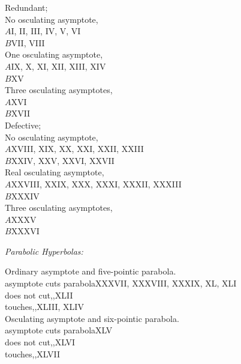 \documentclass[11pt,a4paper]{article}
\begin{document}
\noindent\quad Redundant;\\
\quad\quad No osculating asymptote,\\
\quad\quad\quad $A$\quad I, II, III, IV, V, VI\\
\quad\quad\quad $B$\quad VII, VIII\\
\quad\quad One osculating asymptote,\\
\quad\quad\quad $A$\quad IX, X, XI, XII, XIII, XIV\\
\quad\quad\quad $B$\quad XV\\
\quad\quad Three osculating asymptotes,\\
\quad\quad\quad $A$\quad XVI\\
\quad\quad\quad $B$\quad XVII\\
\quad Defective;\\
\quad\quad No osculating asymptote,\\
\quad\quad\quad $A$\quad XVIII, XIX, XX, XXI, XXII, XXIII\\
\quad\quad\quad $B$\quad XXIV, XXV, XXVI, XXVII\\
\quad\quad Real osculating asymptote,\\
\quad\quad\quad $A$\quad XXVIII, XXIX, XXX, XXXI, XXXII, XXXIII\\
\quad\quad\quad $B$\quad XXXIV\\
\quad\quad Three osculating asymptotes,\\
\quad\quad\quad $A$\quad XXXV\\
\quad\quad\quad $B$\quad XXXVI

\smallskip

\noindent\textit{Parabolic Hyperbolas:}
\smallskip

\noindent\quad Ordinary asymptote and five-pointic parabola.\\
\quad\quad asymptote cuts parabola\quad XXXVII, XXXVIII, XXXIX, XL, XLI\\
\quad\quad does not cut\quad\quad,,\quad\quad XLII\\
\quad\quad touches\quad\quad,,\quad\quad XLIII, XLIV\\

\noindent\quad Osculating asymptote and six-pointic parabola.\\
\quad\quad asymptote cuts parabola\quad XLV\\
\quad\quad does not cut\quad\quad,,\quad\quad XLVI\\
\quad\quad touches\quad\quad,,\quad\quad XLVII

\smallskip
\end{document}
